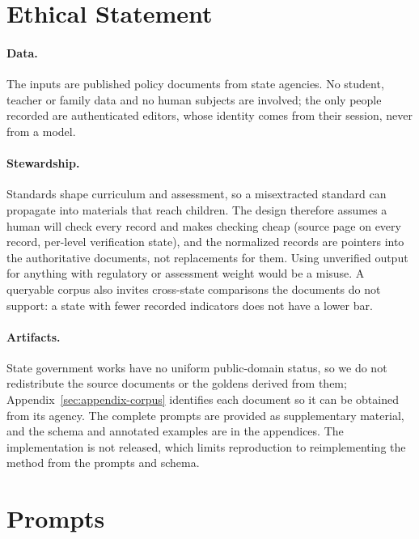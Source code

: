 \documentclass[letterpaper]{article} %
\begin{document}
\section*{Ethical Statement}
\label{sec:ethics}\label{sec:artifacts-statement}

\paragraph{Data.} The inputs are published policy documents from state
agencies. No student, teacher or family data and no human subjects are
involved; the only people recorded are authenticated editors, whose identity
comes from their session, never from a model.

\paragraph{Stewardship.} Standards shape curriculum and assessment, so a
misextracted standard can propagate into materials that reach children. The
design therefore assumes a human will check every record and makes checking
cheap (source page on every record, per-level verification state), and the
normalized records are pointers into the authoritative documents, not
replacements for them. Using unverified output for anything with regulatory or
assessment weight would be a misuse. A queryable corpus also invites
cross-state comparisons the documents do not support: a state with fewer
recorded indicators does not have a lower bar.

\paragraph{Artifacts.} State government works have no uniform public-domain
status, so we do not redistribute the source documents or the goldens derived
from them; Appendix~\ref{sec:appendix-corpus} identifies each document so it
can be obtained from its agency. The complete prompts are provided as
supplementary material, and the schema and annotated examples are in the
appendices. The implementation is not released, which limits reproduction to
reimplementing the method from the prompts and schema.



\appendix

\section{Prompts}
\label{sec:appendix-prompts}

\end{document}
